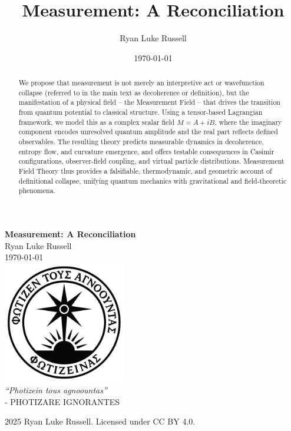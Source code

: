 \documentclass[12pt]{report}
\title{Measurement: A Reconciliation}
\author{Ryan Luke Russell}
\date{\today}
\begin{document}
\pagestyle{fancy}
\fancyhf{}
\lhead{\leftmark}
\rhead{\thepage}
\renewcommand{\headrulewidth}{0.4pt}
\renewcommand{\footrulewidth}{0pt}



\begin{titlepage}
    \centering
    \vspace*{2.5cm}
    {\Huge\bfseries Measurement: A Reconciliation \\[0.5em]}
    {\LARGE Ryan Luke Russell}\\[0.5cm]
    {\large \today}\\[3cm]
    \includegraphics[width=0.4\textwidth]{images/morningstar.png}\\[1cm]
    {\Large\itshape \textquotedblleft Photizein tous agnoountas\textquotedblright}\\
    {\large - PHOTIZARE IGNORANTES}
    \vfill
\end{titlepage}

\begin{abstract}
We propose that measurement is not merely an interpretive act or wavefunction collapse (referred to in the main text as decoherence or definition), but the manifestation of a physical field -- the Measurement Field -- that drives the transition from quantum potential to classical structure. Using a tensor-based Lagrangian framework, we model this as a complex scalar field \(M = A + iB\), where the imaginary component encodes unresolved quantum amplitude and the real part reflects defined observables. The resulting theory predicts measurable dynamics in decoherence, entropy flow, and curvature emergence, and offers testable consequences in Casimir configurations, observer-field coupling, and virtual particle distributions. Measurement Field Theory thus provides a falsifiable, thermodynamic, and geometric account of definitional collapse, unifying quantum mechanics with gravitational and field-theoretic phenomena.
\end{abstract}

  
\tableofcontents



\nocite{*}


\printbibliography

\vspace{2cm}
\begin{center}
    \textcopyright{}
    2025 Ryan Luke Russell. Licensed under CC BY 4.0.
\end{center}
\end{document}
